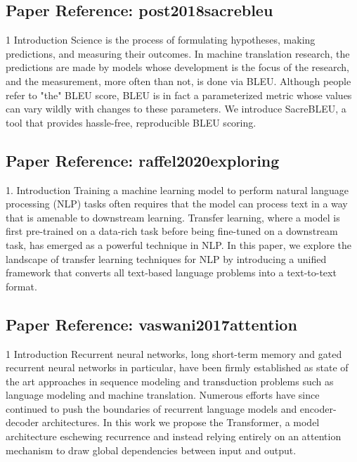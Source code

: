 \documentclass[11pt,a4paper]{article}
\begin{document}
\subsection*{Paper Reference: post2018sacrebleu}

1 Introduction Science is the process of formulating hypotheses, making predictions, and measuring their outcomes. In machine translation research, the predictions are made by models whose development is the focus of the research, and the measurement, more often than not, is done via BLEU. Although people refer to "the" BLEU score, BLEU is in fact a parameterized metric whose values can vary wildly with changes to these parameters. We introduce SacreBLEU, a tool that provides hassle-free, reproducible BLEU scoring.

\vspace{18pt}


\subsection*{Paper Reference: raffel2020exploring}

1. Introduction Training a machine learning model to perform natural language processing (NLP) tasks often requires that the model can process text in a way that is amenable to downstream learning. Transfer learning, where a model is first pre-trained on a data-rich task before being fine-tuned on a downstream task, has emerged as a powerful technique in NLP. In this paper, we explore the landscape of transfer learning techniques for NLP by introducing a unified framework that converts all text-based language problems into a text-to-text format.

\vspace{18pt}


\subsection*{Paper Reference: vaswani2017attention}

1 Introduction Recurrent neural networks, long short-term memory and gated recurrent neural networks in particular, have been firmly established as state of the art approaches in sequence modeling and transduction problems such as language modeling and machine translation. Numerous efforts have since continued to push the boundaries of recurrent language models and encoder-decoder architectures. In this work we propose the Transformer, a model architecture eschewing recurrence and instead relying entirely on an attention mechanism to draw global dependencies between input and output.
\end{document}
